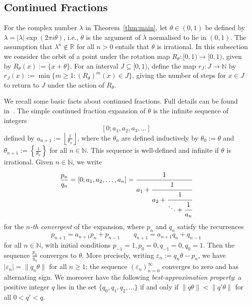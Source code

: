 \documentclass[a4paper,UKenglish,cleveref, autoref, thm-restate]{lipics-v2021}
\def\N{\mathbb{N}}
\begin{document}
\subsection{Continued Fractions}
\label{sec:continued}
For the complex number $\lambda$ in Theorem~\ref{thm:main}, let
$\theta \in (0,1)$ be defined by
$\lambda = |\lambda|\exp(2\pi i \theta)$, i.e., $\theta$ is the
argument of $\lambda$ normalised to lie in $(0,1)$.  The assumption
that $\lambda^n\not\in\mathbb R$ for all $n>0$ entails that $\theta$
is irrational.  
In this subsection we consider 
the orbit of a point under the rotation map $R_\theta:[0,1)\rightarrow [0,1)$,
given by $R_\theta(x):=\{x+\theta\}$.
For an interval $J\subseteq [0,1)$, define the map $r_J : J \rightarrow \N$ by $r_J(x):=\min\{ m \geq 1: (R_\theta)^m(x) \in J\}$, giving the number of steps for $x \in J$ to return to $J$ under the action of $R_\theta$.  

We recall some basic facts about continued fractions.  Full details can be found in~\cite[Section 6.2]{Baker2012}.
The simple continued fraction expansion of $\theta$ is the infinite sequence of integers 
\[[0; a_1, a_2, a_3, \ldots]\]
defined by $a_{n+1}:=\left\lfloor \frac{1}{\theta_n} \right\rfloor$, where the $\theta_n$ are
defined inductively by $\theta_0:=\theta$ and
$\theta_{n+1}:=\left\{ \frac{1}{\theta_n} \right\}$ for all $n\in \mathbb N$.  This
sequence is well-defined and infinite if $\theta$ is irrational.
Given $n\in \mathbb{N}$, we write
\[
\frac{p_n}{q_n} =
[0; a_1, a_2, \ldots, a_n]
=
\cfrac{1}{a_1+\cfrac{1}{a_2+\cfrac{1}{\ddots+\cfrac{1}{a_n}}}} 
\]
for the \emph{$n$-th convergent} of the expansion, where $p_n$ and $q_n$ satisfy 
the recurrences 
\[
p_{n+1}=a_{n+1}p_{n}+p_{n-1} \qquad q_{n+1}=a_{n+1}q_{n}+q_{n-1} 
\]
for all $n\in \mathbb N$, with initial conditions $p_{-1}=1,p_0=0,q_{-1}=0,q_0=1$.
Then the sequence $\frac{p_n}{q_n}$ converges to $\theta$.  More precisely, 
writing $\varepsilon_n:=q_n\theta-p_n$, we have $|\varepsilon_n|=\|q_n\theta\|$ for all $n\geq 1$; the sequence $(\varepsilon_n)_{n=0}^\infty$ converges to zero and has
alternating sign.  We moreover have the following \emph{best-approximation property}: a positive integer $q$ lies in the set
$\{q_0,q_1,q_2,\ldots\}$ if and only if $\|q\theta\|<\|q'\theta\|$ for all $0<q'<q$.
\end{document}
